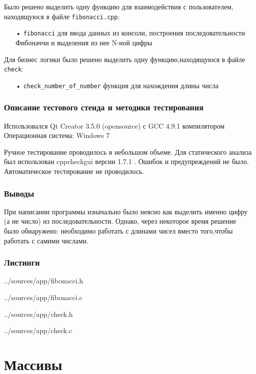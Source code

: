 \documentclass[12pt,a4paper]{report}
\begin{document}
Было решено выделить одну функцию для взаимодействия с пользователем, находящуюся в файле \verb-fibonacci.cpp-:
\begin{enumerate}
\item[•] \verb-fibonacci- для ввода данных из консоли, построения последовательности Фибоначчи и выделения из нее N-ной цифры
\end{enumerate}


Для бизнес логики было решено выделить одну функцию,находящуюся в файле \verb-check-:
\begin{enumerate}
\item[•] \verb-check_number_of_number- функция для нахождения длины числа
\end{enumerate}


\subsection{Описание тестового стенда и методики тестирования}

Использовался Qt Creator 3.5.0 (opensource) с GCC 4.9.1 компилятором
Операционная система: Windows 7


Ручное тестирование проводилось в небольшом объеме.
Для статического анализа был использован cppcheckgui версии 1.7.1 . Ошибок и предупреждений не было.
Автоматическое тестирование не проводилось.


\subsection{Выводы}

При написании программы изначально было неясно как выделить именно цифру (а не число) из последовательности. Однако, через некоторое время решение было обнаружено: необходимо работать с длинами чисел вместо того,чтобы работать с самими числами.

\subsection{Листинги}

{../sources/app/fibonacci.h}

{../sources/app/fibonacci.c}

{../sources/app/check.h}

{../sources/app/check.c}



\chapter{Массивы}
\end{document}
